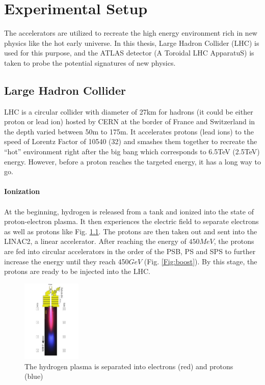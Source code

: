 \chapter{Experimental Setup}
\label{chap:exp}
The accelerators are utilized to recreate the high energy environment rich in new physics like the hot early universe. In this thesis, Large Hadron Collider (LHC) is used for this purpose, and the ATLAS detector (A Toroidal LHC ApparatuS) is taken to probe the potential signatures of new physics. 
\section{Large Hadron Collider }
LHC is a circular collider with diameter of 27km for hadrons (it could be either proton or lead ion) hosted by CERN at the border of France and Switzerland in the depth varied between 50m to 175m. It accelerates protons (lead ions) to the speed of Lorentz Factor of 10540 (32) and smashes them together to recreate the ``hot'' environment right after the big bang which corresponds to 6.5TeV (2.5TeV) energy. However, before a proton reaches the targeted energy, it has a long way to go.
\\
\\{\bf Ionization}
\\
\\At the beginning, hydrogen is released from a tank and ionized into the state of proton-electron plasma. It then experiences the electric field to separate electrons as well as protons like Fig. \ref{Fig:ionization}. The protons are then taken out and sent into the LINAC2, a linear accelerator. After reaching the energy of $450MeV$, the protons are fed into circular accelerators in the order of the PSB, PS and SPS to further increase the energy until they reach 450$GeV$ (Fig. \ref{Fig:boost}). By this stage, the protons are ready to be injected into the LHC.
\begin{figure}[!h]                
	\includegraphics[width=0.25\textwidth]{Chapter2/ionization.png}
	\centering
	\begin{center}
		\caption{The hydrogen plasma is separated into electrons (red) and protons (blue)}
		\label{Fig:ionization}            
	\end{center}
\end{figure}
